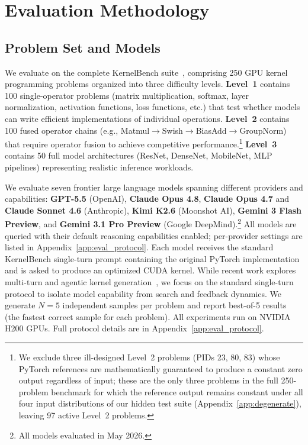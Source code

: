 \documentclass[11pt]{article}
\begin{document}
\section{Evaluation Methodology}
\label{sec:design}

\subsection{Problem Set and Models}

We evaluate on the complete KernelBench suite~\cite{kernelbench}, comprising 250 GPU kernel programming problems organized into three difficulty levels. \textbf{Level~1} contains 100 single-operator problems (matrix multiplication, softmax, layer normalization, activation functions, loss functions, etc.) that test whether models can write efficient implementations of individual operations. \textbf{Level~2} contains 100 fused operator chains (e.g., Matmul$\to$Swish$\to$BiasAdd$\to$GroupNorm) that require operator fusion to achieve competitive performance.\footnote{We exclude three ill-designed Level~2 problems (PIDs 23, 80, 83) whose PyTorch references are mathematically guaranteed to produce a constant zero output regardless of input; these are the only three problems in the full 250-problem benchmark for which the reference output remains constant under all four input distributions of our hidden test suite (Appendix~\ref{app:degenerate}), leaving 97 active Level~2 problems.} \textbf{Level~3} contains 50 full model architectures (ResNet, DenseNet, MobileNet, MLP pipelines) representing realistic inference workloads.

We evaluate seven frontier large language models spanning different providers and capabilities: \textbf{GPT-5.5} (OpenAI), \textbf{Claude Opus 4.8}, \textbf{Claude Opus 4.7} and \textbf{Claude Sonnet 4.6} (Anthropic), \textbf{Kimi K2.6} (Moonshot AI), \textbf{Gemini 3 Flash Preview}, and \textbf{Gemini 3.1 Pro Preview} (Google DeepMind).\footnote{All models evaluated in May 2026.} All models are queried with their default reasoning capabilities enabled; per-provider settings are listed in Appendix~\ref{app:eval_protocol}. Each model receives the standard KernelBench single-turn prompt containing the original PyTorch implementation and is asked to produce an optimized CUDA kernel. While recent work explores multi-turn and agentic kernel generation~\cite{DBLP:journals/corr/abs-2602-24286,kernelbench}, we focus on the standard single-turn protocol to isolate model capability from search and feedback dynamics. We generate $N=5$ independent samples per problem and report best-of-5 results (the fastest correct sample for each problem).
All experiments run on NVIDIA H200 GPUs. Full protocol details are in Appendix~\ref{app:eval_protocol}.
\end{document}
